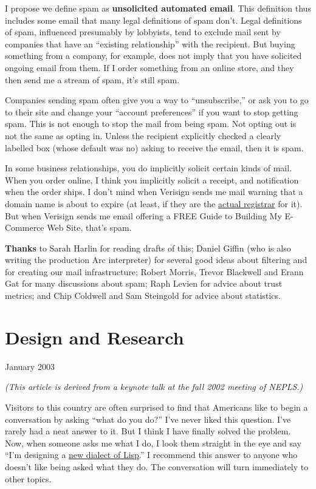 \documentclass[12pt]{book}
\begin{document}
I propose we define spam as \textbf{unsolicited automated email}. This
definition thus includes some email that many legal definitions of spam
don't. Legal definitions of spam, influenced presumably by lobbyists,
tend to exclude mail sent by companies that have an ``existing
relationship'' with the recipient. But buying something from a company,
for example, does not imply that you have solicited ongoing email from
them. If I order something from an online store, and they then send me a
stream of spam, it's still spam.

Companies sending spam often give you a way to ``unsubscribe,'' or ask
you to go to their site and change your ``account preferences'' if you
want to stop getting spam. This is not enough to stop the mail from
being spam. Not opting out is not the same as opting in. Unless the
recipient explicitly checked a clearly labelled box (whose default was
no) asking to receive the email, then it is spam.

In some business relationships, you do implicitly solicit certain kinds
of mail. When you order online, I think you implicitly solicit a
receipt, and notification when the order ships. I don't mind when
Verisign sends me mail warning that a domain name is about to expire (at
least, if they are the
\href{http://siliconvalley.internet.com/news/article.php/1441651}{actual
registrar} for it). But when Verisign sends me email offering a FREE
Guide to Building My E-Commerce Web Site, that's spam.

\textbf{Thanks} to Sarah Harlin for reading drafts of this; Daniel
Giffin (who is also writing the production Arc interpreter) for several
good ideas about filtering and for creating our mail infrastructure;
Robert Morris, Trevor Blackwell and Erann Gat for many discussions about
spam; Raph Levien for advice about trust metrics; and Chip Coldwell and
Sam Steingold for advice about statistics.
\chapter{Design and Research}

January 2003

\emph{(This article is derived from a keynote talk at the fall 2002
meeting of NEPLS.)}

Visitors to this country are often surprised to find that Americans like
to begin a conversation by asking ``what do you do?'' I've never liked
this question. I've rarely had a neat answer to it. But I think I have
finally solved the problem. Now, when someone asks me what I do, I look
them straight in the eye and say ``I'm designing a \href{arc.html}{new
dialect of Lisp}.'' I recommend this answer to anyone who doesn't like
being asked what they do. The conversation will turn immediately to
other topics.
\end{document}
